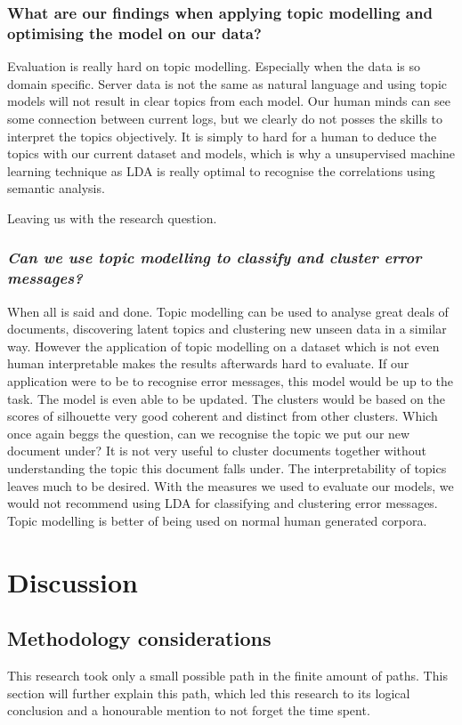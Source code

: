 \subsubsection{What are our findings when applying topic modelling and optimising the model on our data?}
Evaluation is really hard on topic modelling. Especially when the data is so domain specific. Server data is not the same as natural language and using topic models will not result in clear topics from each model. Our human minds can see some connection between current logs, but we clearly do not posses the skills to interpret the topics objectively. It is simply to hard for a human to deduce the topics with our current dataset and models, which is why a unsupervised machine learning technique as LDA is really optimal to recognise the correlations using semantic analysis.

\noindent Leaving us with the research question.

\subsubsection{\textbf{\textit{Can we use topic modelling to classify and cluster error messages?}}}

When all is said and done. Topic modelling can be used to analyse great deals of documents, discovering latent topics and clustering new unseen data in a similar way. However the application of topic modelling on a dataset which is not even human interpretable makes the results afterwards hard to evaluate. If our application were to be to recognise error messages, this model would be up to the task. The model is even able to be updated. The clusters would be based on the scores of silhouette very good coherent and distinct from other clusters. Which once again beggs the question, can we recognise the topic we put our new document under? It is not very useful to cluster documents together without understanding the topic this document falls under. The interpretability of topics leaves much to be desired. With the measures we used to evaluate our models, we would not recommend using LDA for classifying and clustering error messages. Topic modelling is better of being used on normal human generated corpora.

\section{Discussion}

\subsection {Methodology considerations}
This research took only a small possible path in the finite amount of paths. This section will further explain this path, which led this research to its logical conclusion and a honourable mention to not forget the time spent.

